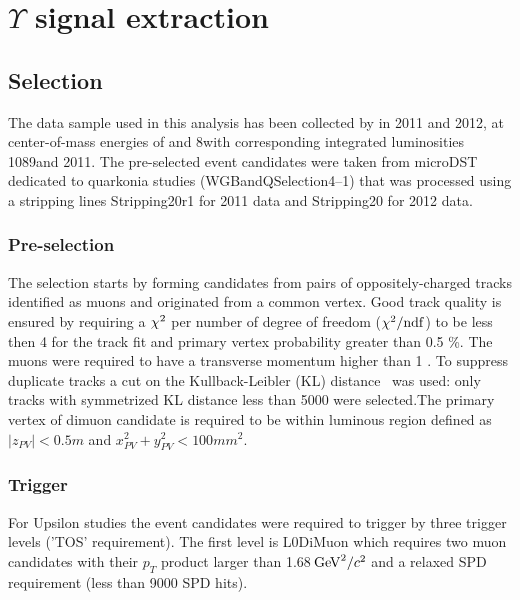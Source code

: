 \section{\texorpdfstring{$\Upsilon$}{Y} signal extraction}
\label{sec:upsilon}

\subsection{Selection}
\label{sec:ups:selelection}
The data sample used in this analysis has been collected by \lhcb in 2011 and
2012, at center-of-mass energies of \tev and 8\tev with corresponding
integrated luminosities 1089\invpb and 2011\invpb.
The pre-selected event candidates were taken from microDST dedicated to
quarkonia studies (WGBandQSelection4--1) that was processed using a 
stripping lines Stripping20r1 for 2011 data and Stripping20 for 2012 data.

\subsubsection{Pre-selection}
\label{sec:upsilon:selelection:preselection}

The selection starts by forming candidates from pairs of oppositely-charged
tracks identified as muons and originated from a common vertex. Good track
quality is ensured by requiring a $\chi^2$ per number of degree of freedom
($\chi^2/\rm{ndf}$) to be less then 4 for the track fit and primary vertex
probability greater than 0.5 \%. The muons were required to have a transverse
momentum higher than 1 \gevc. To suppress duplicate tracks a  cut on the
Kullback-Leibler (KL) distance~\cite{Needham:1082460} was used: only tracks
with symmetrized KL distance less than 5000 were selected.The primary vertex of
dimuon candidate is required to be within luminous region defined as $|z_{PV}|
< 0.5 m$ and $x_{PV}^2 + y_{PV}^2 < 100 mm^2$.
\subsubsection{Trigger}
\label{sec:upsilon:selection:trigger}

For Upsilon studies the event candidates  were required to trigger by three
trigger levels ('TOS' requirement). The first level is L0DiMuon which  requires
two muon candidates with their $p_T$ product larger than 1.68$\mathrm{\,Ge\kern -0.1em V}^2/c^2$ and
a relaxed SPD requirement (less than 9000 SPD hits).

